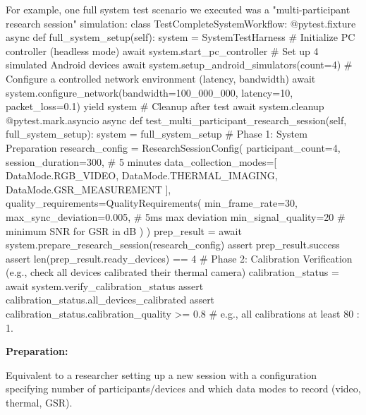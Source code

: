 {{{For example, one full system test scenario we executed was a "multi-participant research session" simulation: class TestCompleteSystemWorkflow: @pytest.fixture async def full\_system\_setup(self): system = SystemTestHarness # Initialize PC controller (headless mode) await system.start\_pc\_controller # Set up 4 simulated Android devices await system.setup\_android\_simulators(count=4) # Configure a controlled network environment (latency, bandwidth) await system.configure\_network(bandwidth=100\_000\_000, latency=10, packet\_loss=0.1) yield system # Cleanup after test await system.cleanup @pytest.mark.asyncio async def test\_multi\_participant\_research\_session(self, full\_system\_setup): system = full\_system\_setup # Phase 1: System Preparation research\_config = ResearchSessionConfig( participant\_count=4, session\_duration=300, # 5 minutes data\_collection\_modes=[ DataMode.RGB\_VIDEO, DataMode.THERMAL\_IMAGING, DataMode.GSR\_MEASUREMENT ], quality\_requirements=QualityRequirements( min\_frame\_rate=30, max\_sync\_deviation=0.005, # 5ms max deviation min\_signal\_quality=20 # minimum SNR for GSR in dB ) ) prep\_result = await system.prepare\_research\_session(research\_config) assert prep\_result.success assert len(prep\_result.ready\_devices) == 4 # Phase 2: Calibration Verification (e.g., check all devices calibrated their thermal camera) calibration\_status = await system.verify\_calibration\_status assert calibration\_status.all\_devices\_calibrated assert calibration\_status.calibration\_quality >= 0.8 # e.g., all calibrations at least 80%
: 1.

\textbf{Preparation:}

Equivalent to a researcher setting up a new session with a configuration specifying number of participants/devices and which data modes to record (video, thermal, GSR).

}}}
